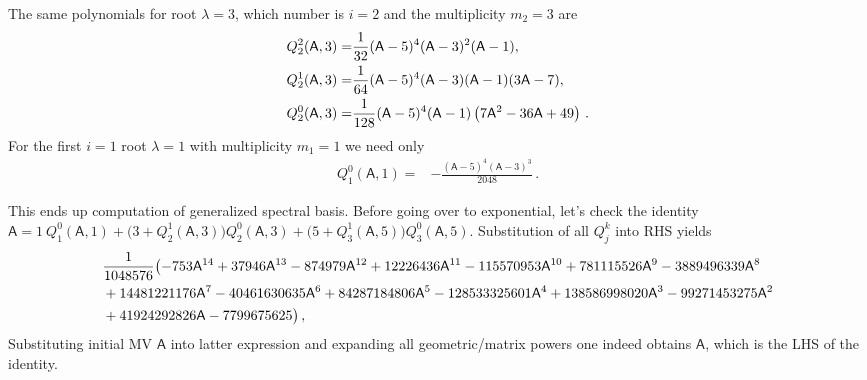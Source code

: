 \documentclass[AMA,STIX1COL]{WileyNJD-v2}
\def\m#1{\mathsf{#1}} %
\def\m#1{\mathsf{#1}}%
\begin{document}
\begin{eexample}
The same polynomials for root $\lambda=3$, which number is $i=2$ and the multiplicity  $m_2=3$ are
\begin{align}
 {Q^{2}_2}(\m{A},3)=&\frac{1}{32} (\m{A}-5)^4 (\m{A}-3)^2 (\m{A}-1),\notag\\
 {Q^{1}_2}(\m{A},3)=&\frac{1}{64} (\m{A}-5)^4 (\m{A}-3) (\m{A}-1) (3 \m{A}-7), \notag\\
 {Q^{0}_2}(\m{A},3)=&\frac{1}{128} (\m{A}-5)^4 (\m{A}-1) \left(7 \m{A}^2-36 \m{A}+49\right)\notag\,.
\end{align}
For the first  $i=1$  root $\lambda=1$ with multiplicity $m_1=1$ we need only
  \begin{align}{Q^{0}_1}(\m{A},1)=&-\frac{(\m{A}-5)^4 (\m{A}-3)^3}{2048}\,.
   \end{align}

This ends up computation of generalized spectral basis. Before going over to exponential,
let's check the identity $\m{A}=1\ {Q^{0}_1}(\m{A},1) + \bigl(3 + {Q^{1}_2}(\m{A},3)\bigr)
  {Q^{0}_2}(\m{A},3) + \bigl(5 +  {Q^{1}_3}(\m{A},5)\bigr){Q^{0}_3}(\m{A},5)
$.  Substitution of all $Q^{k}_j$ into RHS yields
  \begin{align}&\frac{1}{1048576}  \bigl(-753 \m{A}^{14}+37946 \m{A}^{13}-874979 \m{A}^{12}+12226436 \m{A}^{11}-115570953 \m{A}^{10}+781115526 \m{A}^9-3889496339 \m{A}^8\notag\\
    &+14481221176 \m{A}^7-40461630635 \m{A}^6+84287184806 \m{A}^5-128533325601
    \m{A}^4+138586998020 \m{A}^3-99271453275 \m{A}^2\notag\\
    &+41924292826 \m{A}-7799675625\bigr)\,,
   \end{align}
Substituting initial MV $\m{A}$ into latter expression and expanding all geometric/matrix powers
one indeed obtains $\m{A}$, which is the LHS of the identity.


\end{eexample}
\end{document}
